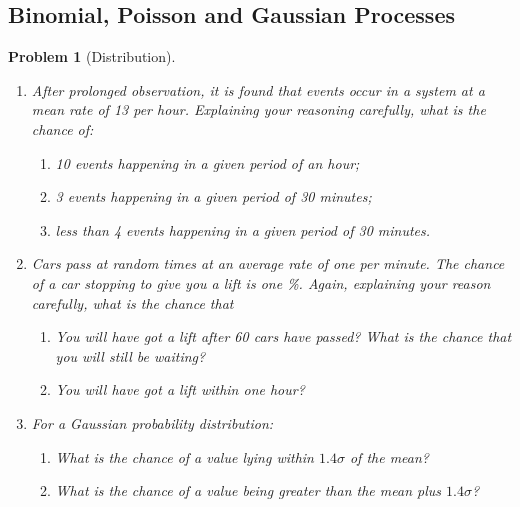 \documentclass[a4paper]{article}
\theoremstyle{new}
\newtheorem{qns}{Problem}[section]
\begin{document}
\subsection{Binomial, Poisson and Gaussian Processes}
\begin{qns}[Distribution]\leavevmode
\begin{enumerate}[label=(\alph*)]
\item After prolonged observation, it is found that events occur in a system at a mean rate of 13 per hour. Explaining your reasoning carefully, what is the chance of:
\begin{enumerate}[label=(\roman*)]
    \item 10 events happening in a given period of an hour;
    \item 3 events happening in a given period of 30 minutes;
    \item less than 4 events happening in a given period of 30 minutes.
\end{enumerate}
\item Cars pass at random times at an average rate of one per minute. The chance of a car stopping to give you a lift is one \%. Again, explaining your reason carefully, what is the chance that
\begin{enumerate}[label=(\roman*)]
    \item You will have got a lift after 60 cars have passed? What is the chance that you will still be waiting?
    \item You will have got a lift within one hour?
\end{enumerate}
\item For a Gaussian probability distribution:
\begin{enumerate}[label=(\roman*)]
    \item What is the chance of a value lying within $1.4\sigma$ of the mean?
    \item What is the chance of a value being greater than the mean plus $1.4\sigma$?
\end{enumerate}
\end{enumerate}
\end{qns}
\end{document}

